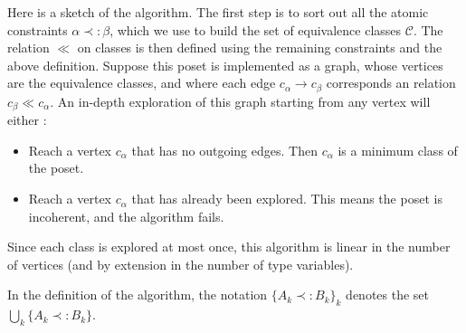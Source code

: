 \begin{defn}
  Here is a sketch of the algorithm.
  The first step is to sort out all the atomic constraints $\alpha \prec: \beta$, which we use to build the set of equivalence classes
  $\mathcal{C}$. The relation $\ll$ on classes is then defined using the remaining constraints and the above definition.
  Suppose this poset is implemented as a graph, whose vertices are the equivalence classes, and where each edge
  $c_\alpha \rightarrow c_\beta$ corresponds an relation $c_\beta \ll c_\alpha$. An in-depth exploration of this graph starting from any
  vertex will either :
  	\begin{itemize}
  		\item Reach a vertex $c_\alpha$ that has no outgoing edges. Then $c_\alpha$ is a minimum class of the poset.
  		\item Reach a vertex $c_\alpha$ that has already been explored. This means the poset is incoherent, and the algorithm fails.
  	\end{itemize}
  Since each class is explored at most once, this algorithm is linear in the number of vertices (and by extension in the number of type
  variables).
\end{defn}

In the definition of the algorithm, the notation $\{ A_k \prec: B_k \}_k$ denotes the set $\bigcup_{k} \{ A_k \prec: B_k \}$.

